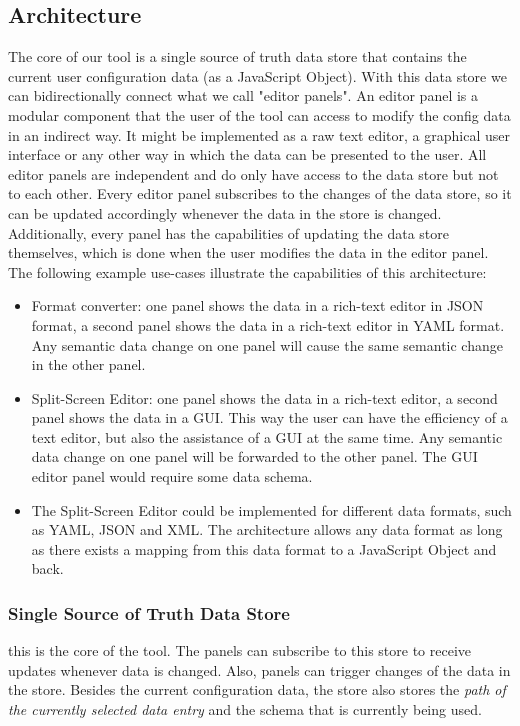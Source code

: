 \documentclass[lettersize,journal]{IEEEtran}
\begin{document}
\subsection{Architecture}
The core of our tool is a single source of truth data store that contains the current user configuration data (as a JavaScript Object). With this data store we can bidirectionally connect what we call "editor panels". An editor panel is a modular component that the user of the tool can access to modify the config data in an indirect way. It might be implemented as a raw text editor, a graphical user interface or any other way in which the data can be presented to the user. All editor panels are independent and do only have access to the data store but not to each other. Every editor panel subscribes to the changes of the data store, so it can be updated accordingly whenever the data in the store is changed. Additionally, every panel has the capabilities of updating the data store themselves, which is done when the user modifies the data in the editor panel. The following example use-cases illustrate the capabilities of this architecture:

\begin{itemize}
    \item Format converter: one panel shows the data in a rich-text editor in JSON format, a second panel shows the data in a rich-text editor in YAML format. Any semantic data change on one panel will cause the same semantic change in the other panel.
    \item Split-Screen Editor: one panel shows the data in a rich-text editor, a second panel shows the data in a GUI. This way the user can have the efficiency of a text editor, but also the assistance of a GUI at the same time. Any semantic data change on one panel will be forwarded to the other panel. The GUI editor panel would require some data schema.
    \item The Split-Screen Editor could be implemented for different data formats, such as YAML, JSON and XML. The architecture allows any data format as long as there exists a mapping from this data format to a JavaScript Object and back.
\end{itemize}


\subsubsection{Single Source of Truth Data Store}
this is the core of the tool. The panels can subscribe to this store to receive updates whenever data is changed. Also, panels can trigger changes of the data in the store.
Besides the current configuration data, the store also stores the \textit{path of the currently selected data entry} and the schema that is currently being used.
\end{document}
